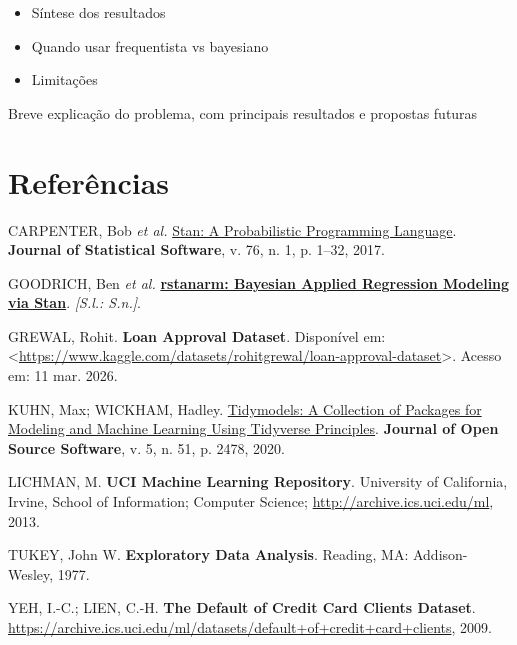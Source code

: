 \documentclass[
  brazilian,
  12pt,
  letterpaper,
  DIV=11,
  numbers=noendperiod]{scrartcl}
\newlength{\cslhangindent}
\newenvironment{CSLReferences}[2] %
 {\begin{list}{}{%
  \setlength{\itemindent}{0pt}
  \setlength{\leftmargin}{0pt}
  \setlength{\parsep}{0pt}
  \ifodd #1
   \setlength{\leftmargin}{\cslhangindent}
   \setlength{\itemindent}{-1\cslhangindent}
  \fi
  \setlength{\itemsep}{#2\baselineskip}}}
 {\end{list}}
\providecommand{\tightlist}{%
  \setlength{\itemsep}{0pt}\setlength{\parskip}{0pt}}
\begin{document}
\begin{itemize}
\tightlist
\item
  Síntese dos resultados
\item
  Quando usar frequentista vs bayesiano
\item
  Limitações
\end{itemize}

Breve explicação do problema, com principais resultados e propostas
futuras

\section*{Referências}\label{referuxeancias}

\protect{}\label{refs}
\begin{CSLReferences}{0}{1}
CARPENTER, Bob \emph{et al.}
\href{https://doi.org/10.18637/jss.v076.i01}{Stan: A Probabilistic
Programming Language}. \textbf{Journal of Statistical Software}, v. 76,
n. 1, p. 1--32, 2017.

GOODRICH, Ben \emph{et al.}
\textbf{\href{https://mc-stan.org/rstanarm/}{rstanarm: Bayesian Applied
Regression Modeling via Stan}}. \emph{{[}S.l.: S.n.{]}}.

GREWAL, Rohit. \textbf{Loan Approval Dataset}. Disponível em:
\textless{}\url{https://www.kaggle.com/datasets/rohitgrewal/loan-approval-dataset}\textgreater.
Acesso em: 11 mar. 2026.

KUHN, Max; WICKHAM, Hadley.
\href{https://doi.org/10.21105/joss.02478}{Tidymodels: A Collection of
Packages for Modeling and Machine Learning Using Tidyverse Principles}.
\textbf{Journal of Open Source Software}, v. 5, n. 51, p. 2478, 2020.

LICHMAN, M. \textbf{UCI Machine Learning Repository}. University of
California, Irvine, School of Information; Computer Science;
\url{http://archive.ics.uci.edu/ml}, 2013.

TUKEY, John W. \textbf{Exploratory Data Analysis}. Reading, MA:
Addison-Wesley, 1977.

YEH, I.-C.; LIEN, C.-H. \textbf{The Default of Credit Card Clients
Dataset}.
\url{https://archive.ics.uci.edu/ml/datasets/default+of+credit+card+clients},
2009.

\end{CSLReferences}
\end{document}
